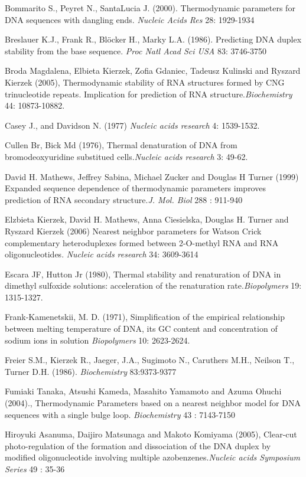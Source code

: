 \documentclass{article}
\begin{document}
Bommarito S., Peyret N., SantaLucia J. (2000).  Thermodynamic parameters for DNA
sequences with dangling ends.  \textit{Nucleic Acids Res} 28: 1929-1934

  Breslauer K.J., Frank R., Bl\"ocker 
H., Marky L.A. (1986). Predicting DNA duplex stability from the base sequence. 
 \textit{Proc Natl Acad Sci USA}  83: 3746-3750   

Broda Magdalena, Elbieta Kierzek, Zofia Gdaniec, Tadeusz Kulinski and Ryszard 
Kierzek (2005), Thermodynamic stability of RNA structures formed by CNG trinucleotide 
repeats. Implication for prediction of RNA structure.\textit{Biochemistry} 
44: 10873-10882.

Casey J., and Davidson N. (1977) \textit{Nucleic acids research} 4: 1539-1532.

Cullen Br, Bick Md (1976), Thermal denaturation of DNA from bromodeoxyuridine 
substitued cells.\textit{Nucleic acids research} 3: 49-62.

David H. Mathews, Jeffrey Sabina, Michael Zucker and Douglas H Turner (1999)
Expanded sequence dependence of thermodynamic parameters improves prediction
of RNA secondary structure.\textit{J. Mol. Biol} 288 : 911-940

Elzbieta Kierzek, David H. Mathews, Anna Ciesielska, Douglas H. Turner and Ryszard Kierzek 
(2006) Nearest neighbor parameters for Watson Crick complementary heteroduplexes
formed between 2-O-methyl RNA and RNA oligonucleotides. \textit{Nucleic acids research} 
34: 3609-3614

Escara JF, Hutton Jr (1980), Thermal stability and renaturation of DNA in dimethyl sulfoxide
solutions: acceleration of the renaturation rate.\textit{Biopolymers} 19: 1315-1327.

Frank-Kamenetskii, M. D. (1971), Simplification of the empirical relationship between 
melting temperature of DNA, its GC content and concentration of sodium ions in solution
\textit{Biopolymers} 10: 2623-2624.

Freier S.M., Kierzek R., Jaeger, J.A., Sugimoto N., Caruthers M.H., Neilson T., Turner D.H.
(1986). \textit{Biochemistry} 
 83:9373-9377 
 
 Fumiaki Tanaka, Atsushi Kameda, Masahito Yamamoto and Azuma Ohuchi (2004)., Thermodynamic 
 Parameters based on a nearest neighbor model for DNA sequences with a single bulge loop.
\textit{Biochemistry} 43 : 7143-7150

Hiroyuki Asanuma, Daijiro Matsunaga and Makoto Komiyama (2005), Clear-cut photo-regulation 
of the formation and dissociation of the DNA duplex by modified oligonucleotide involving 
multiple azobenzenes.\textit{Nucleic acids Symposium Series} 49 : 35-36
\end{document}

